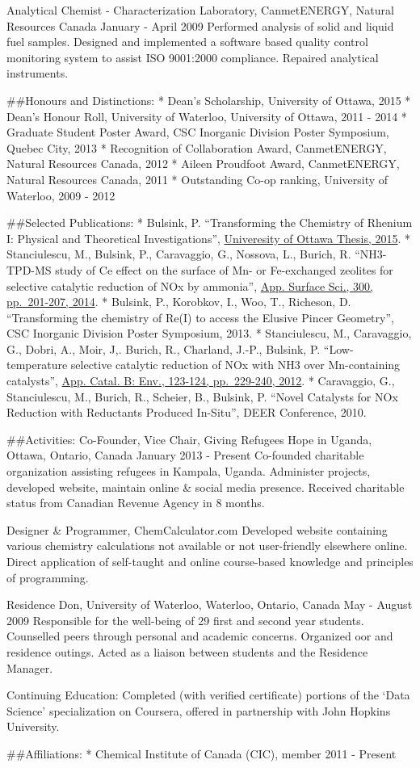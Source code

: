 \documentclass[
]{article}
\begin{document}
Analytical Chemist - Characterization Laboratory, CanmetENERGY, Natural
Resources Canada January - April 2009 Performed analysis of solid and
liquid fuel samples. Designed and implemented a software based quality
control monitoring system to assist ISO 9001:2000 compliance. Repaired
analytical instruments.

\#\#Honours and Distinctions: * Dean's Scholarship, University of
Ottawa, 2015 * Dean's Honour Roll, University of Waterloo, University of
Ottawa, 2011 - 2014 * Graduate Student Poster Award, CSC Inorganic
Division Poster Symposium, Quebec City, 2013 * Recognition of
Collaboration Award, CanmetENERGY, Natural Resources Canada, 2012 *
Aileen Proudfoot Award, CanmetENERGY, Natural Resources Canada, 2011 *
Outstanding Co-op ranking, University of Waterloo, 2009 - 2012

\#\#Selected Publications: * Bulsink, P. ``Transforming the Chemistry of
Rhenium I: Physical and Theoretical Investigations'',
\href{http://www.ruor.uottawa.ca/handle/10393/32065}{Univeresity of
Ottawa Thesis, 2015}. * Stanciulescu, M., Bulsink, P., Caravaggio, G.,
Nossova, L., Burich, R. ``NH3-TPD-MS study of Ce effect on the surface
of Mn- or Fe-exchanged zeolites for selective catalytic reduction of NOx
by ammonia'', \href{http://dx.doi.org/10.1016/j.apcatb.2012.04.012}{App.
Surface Sci., 300, pp.~201-207, 2014}. * Bulsink, P., Korobkov, I., Woo,
T., Richeson, D. ``Transforming the chemistry of Re(I) to access the
Elusive Pincer Geometry'', CSC Inorganic Division Poster Symposium,
2013. * Stanciulescu, M., Caravaggio, G., Dobri, A., Moir, J,. Burich,
R., Charland, J.-P., Bulsink, P. ``Low-temperature selective catalytic
reduction of NOx with NH3 over Mn-containing catalysts'',
\href{http://dx.doi.org/10.1016/j.apsusc.2014.01.175}{App. Catal. B:
Env., 123-124, pp.~229-240, 2012}. * Caravaggio, G., Stanciulescu, M.,
Burich, R., Scheier, B., Bulsink, P. ``Novel Catalysts for NOx Reduction
with Reductants Produced In-Situ'', DEER Conference, 2010.

\#\#Activities: Co-Founder, Vice Chair, Giving Refugees Hope in Uganda,
Ottawa, Ontario, Canada January 2013 - Present Co-founded charitable
organization assisting refugees in Kampala, Uganda. Administer projects,
developed website, maintain online \& social media presence. Received
charitable status from Canadian Revenue Agency in 8 months.

Designer \& Programmer, ChemCalculator.com Developed website containing
various chemistry calculations not available or not user-friendly
elsewhere online. Direct application of self-taught and online
course-based knowledge and principles of programming.

Residence Don, University of Waterloo, Waterloo, Ontario, Canada May -
August 2009 Responsible for the well-being of 29 first and second year
students. Counselled peers through personal and academic concerns.
Organized oor and residence outings. Acted as a liaison between students
and the Residence Manager.

Continuing Education: Completed (with verified certificate) portions of
the `Data Science' specialization on Coursera, offered in partnership
with John Hopkins University.

\#\#Affiliations: * Chemical Institute of Canada (CIC), member 2011 -
Present
\end{document}

